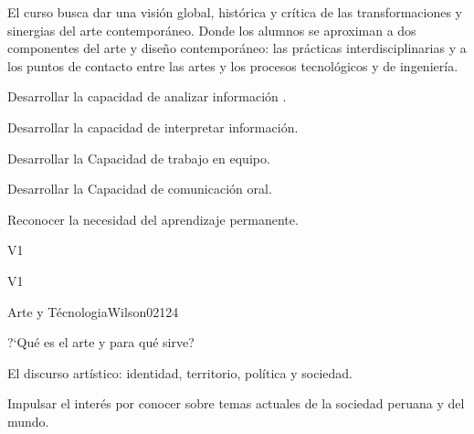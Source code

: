 \begin{syllabus}


\begin{justification}
El curso busca  dar  una visión  global, histórica  y crítica de las transformaciones y sinergias del arte contemporáneo. Donde los alumnos se aproximan a dos componentes del arte y diseño contemporáneo: las prácticas interdisciplinarias  y a los puntos de contacto entre las artes y los procesos tecnológicos y de ingeniería.
\end{justification}

\begin{goals}
    \item Desarrollar la capacidad de analizar información .
    \item Desarrollar la capacidad de interpretar información.
    \item Desarrollar la Capacidad de trabajo en equipo.
    \item Desarrollar la Capacidad de comunicación oral.
    \item Reconocer la necesidad del aprendizaje permanente.
\end{goals}

\begin{outcomes}{V1}
    \item {} %
    \item {} %
    \item {} %
    \item {} %
    \item {} %
\end{outcomes}

\begin{competences}{V1}
    \item {}
    \item {}
    \item {}
    \item {}
\end{competences}

\begin{unit}{Arte y Técnologia}{}{Wilson02}{12}{4}
   \begin{topics}
      \item ?`Qué es el arte y para qué sirve?
      \item El discurso artístico: identidad, territorio, política y sociedad.
   \end{topics}
   \begin{learningoutcomes}
      \item Impulsar el interés por conocer sobre temas actuales de la sociedad peruana y del mundo.
   \end{learningoutcomes}
\end{unit}


\end{syllabus}
